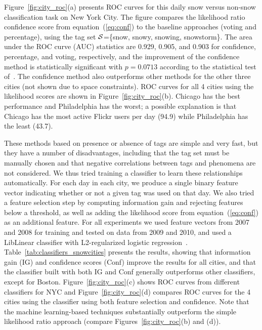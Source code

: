 Figure~\ref{fig:city_roc}(a) presents ROC curves for this
daily snow versus non-snow classification task on New York City. The figure compares the likelihood
ratio confidence score from equation~(\ref{eq:conf}) to the baseline
approaches (voting and percentage), using the tag set
${\cal S}$=\{snow, snowy, snowing, snowstorm\}.
The area under the ROC curve (AUC) statistics are 0.929, 0.905, and 0.903 for confidence, percentage, and voting, respectively, 
and the improvement of the confidence method is statistically significant 
with $p=0.0713$ according to the statistical test of~\cite{auc}.
The confidence method also outperforms other methods for the other three cities (not shown due to
space constraints).  ROC curves for all 4 cities using the likelihood
scores are shown in Figure~\ref{fig:city_roc}(b). Chicago has the best
performance and Philadelphia has the worst; a possible explanation
is that Chicago has the most active Flickr users per
day (94.9) while Philadelphia has the least (43.7).

These methods based on presence or absence of tags are simple and very
fast, but they have a number of disadvantages, including that the tag
set must be manually chosen and that negative correlations between
tags and phenomena are not considered.
We thus tried training a classifier to learn these relationships automatically.
For each day in each city, we produce a single binary feature vector indicating whether 
or not a given tag was used on that day. We also tried a feature selection step
by computing information gain and rejecting features below a threshold, as well as adding the likelihood score from equation~(\ref{eq:conf}) as an additional feature.
For all experiments we used feature vectors from 2007 and 2008 for training and tested on data from 2009 and 2010,
and used   
a LibLinear classifier with L2-regularized logistic regression~\cite{Fan2008}.
Table~\ref{tab:classifiers_snowcities} presents the results, showing that information gain
(IG) and confidence scores (Conf) improve the results for all cities,
and that the classifier built with both IG and Conf generally outperforms
other classifiers, except for Boston.
Figure~\ref{fig:city_roc}(c) shows 
ROC curves from different classifiers for NYC and
Figure~\ref{fig:city_roc}(d) compares ROC curves for the 4 cities
using the classifier using both feature selection and confidence. 
Note that the machine learning-based techniques substantially outperform the
simple likelihood ratio approach (compare
Figures~\ref{fig:city_roc}(b)  and
(d)).


